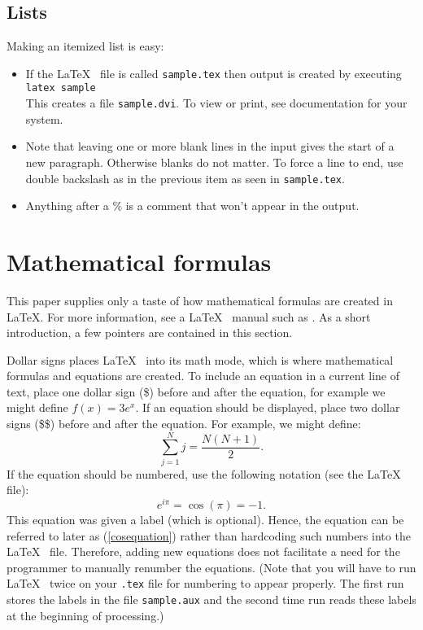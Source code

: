 \subsection{Lists}
Making an itemized list is easy:
\begin{itemize}
\item If the \LaTeX~ file is called {\tt sample.tex} then output is created by
executing \\
   {\tt latex sample} \\
This creates a file {\tt sample.dvi}.
To view or print, see documentation for your system.
\item Note that leaving one or more blank lines
     in the input
gives the start of a new paragraph.  Otherwise blanks
do not   matter.  %
To force a line to end, use double backslash as in the previous item as seen in {\tt sample.tex}.

\item Anything after a \% is a comment that won't appear in the output.
\end{itemize}

\section{Mathematical formulas}

This paper supplies only a taste of how mathematical formulas are created in \LaTeX.  
For more information, see a \LaTeX~ manual such as \cite{go-mi-sa:latex}.  
As a short introduction, a few pointers are contained in this section. 

Dollar signs places \LaTeX~ into its math mode, which is where mathematical formulas and equations
are created.  To include an equation in a current line of text, place one dollar sign (\$) before 
and after the equation, for example we might define $f(x) = 3e^x$.   If an equation should be displayed,
place two dollar signs (\$\$) before and after the equation.  For example, we might define:
$$
\sum_{j=1}^N j = \frac{N(N+1)}{2}.
$$
If the equation should be numbered, use the following notation (see the \LaTeX~ file):
\begin{equation}  
e^{i\pi} = \cos(\pi) = -1.
\label{cosequation}
\end{equation}
This equation was given a label (which is optional).  Hence, the equation
can be referred to later as (\ref{cosequation}) rather than hardcoding such numbers into
the \LaTeX~ file.  Therefore, adding new equations does not facilitate a need for the programmer 
to manually renumber the equations. 
(Note that you will have to run \LaTeX~ twice on your {\tt .tex}
file for numbering to appear properly.  The first run stores the labels in
the file {\tt sample.aux} and the second time run reads these labels at the
beginning of processing.)

